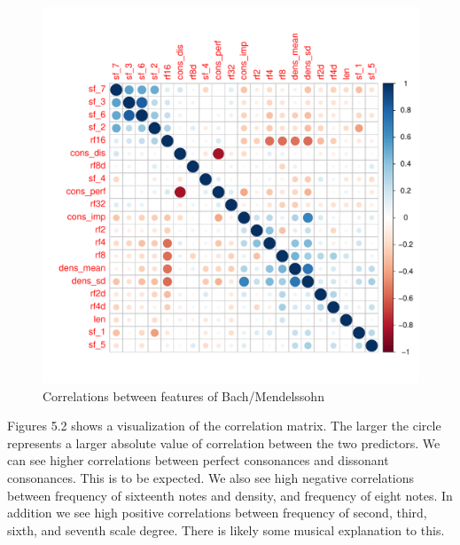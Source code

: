 \documentclass[12pt,twoside]{reedthesis}
\theoremstyle{definition}
\theoremstyle{definition}
\theoremstyle{definition}
\theoremstyle{remark}
\begin{document}
\begin{figure}[H]
\centering
\includegraphics[scale = .5]{images/cor_circles_b.pdf}
\caption{Correlations between features of Bach/Mendelssohn}
\label{subd}
\end{figure}
Figures 5.2 shows a visualization of the correlation matrix. The larger
the circle represents a larger absolute value of correlation between the
two predictors. We can see higher correlations between perfect
consonances and dissonant consonances. This is to be expected. We also
see high negative correlations between frequency of sixteenth notes and
density, and frequency of eight notes. In addition we see high positive
correlations between frequency of second, third, sixth, and seventh
scale degree. There is likely some musical explanation to this.
\end{document}
